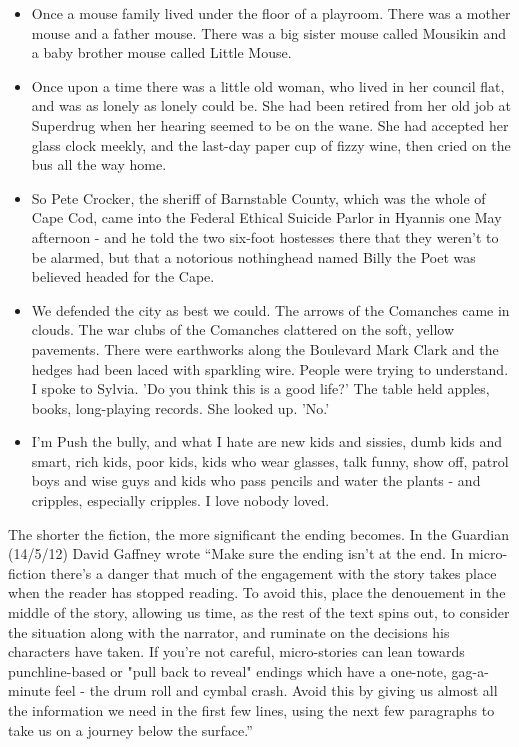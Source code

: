 \documentclass[11pt]{article}
\begin{document}
\begin{itemize}
\item Once a mouse family lived under the floor of a playroom. There was a mother mouse and a father mouse. There was a big sister mouse called Mousikin and a baby brother mouse called Little Mouse.
    \item Once upon a time there was a little old woman, who lived in her council flat, and was as lonely as lonely could be. She had been retired from her old job at Superdrug when her hearing seemed to be on the wane. She had accepted her glass clock meekly, and the last-day paper cup of fizzy wine, then cried on the bus all the way home.
    \item So Pete Crocker, the sheriff of Barnstable County, which was the whole of Cape Cod, came into the Federal Ethical Suicide Parlor in Hyannis one May afternoon - and he told the two six-foot hostesses there that they weren't to be alarmed, but that a notorious nothinghead named Billy the Poet was believed headed for the Cape.
    \item  We defended the city as best we could. The arrows of the Comanches came in clouds. The war clubs of the Comanches clattered on the soft, yellow pavements. There were earthworks along the Boulevard Mark Clark and the hedges had been laced with sparkling wire. People were trying to understand. I spoke to Sylvia. 'Do you think this is a good life?' The table held apples, books, long-playing records. She looked up. 'No.'
    \item I'm Push the bully, and what I hate are new kids and sissies, dumb kids and smart, rich kids, poor kids, kids who wear glasses, talk funny, show off, patrol boys and wise guys and kids who pass pencils and water the plants - and cripples, especially cripples. I love nobody loved.
\end{itemize}

The shorter the fiction, the more significant the ending becomes. In the Guardian (14/5/12) David Gaffney wrote ``Make sure the ending isn't at the end.
In micro-fiction there's a danger that much of the engagement with the story takes place when the reader has stopped reading. To avoid this, place the denouement in the middle of the story, allowing us time, as the rest of the text spins out, to consider the situation along with the narrator, and ruminate on the decisions his characters have taken. If you're not careful, micro-stories can lean towards punchline-based or "pull back to reveal" endings which have a one-note, gag-a-minute feel - the drum roll and cymbal crash. Avoid this by giving us almost all the information we need in the first few lines, using the next few paragraphs to take us on a journey below the surface.''
\end{document}

